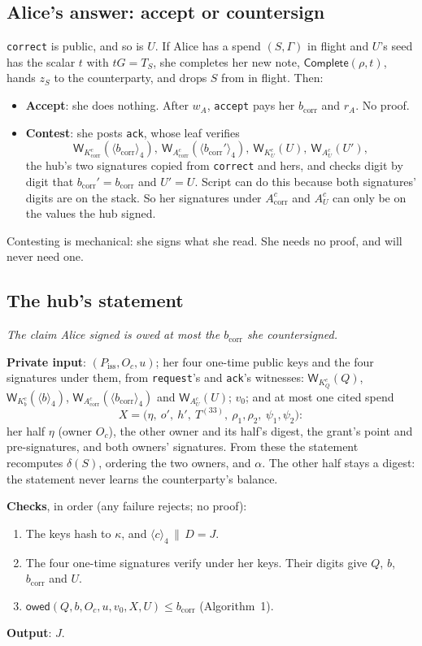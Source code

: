 \documentclass[11pt]{article}
\theoremstyle{plain}
\theoremstyle{definition}
\newcommand{\bcorr}{b_{\mathrm{corr}}}
\newcommand{\tx}[1]{\texttt{#1}}
\newcommand{\be}[2]{\langle #1\rangle_{#2}}
\newcommand{\Compl}{\mathsf{Complete}}
\newcommand{\Wots}{\mathsf{W}}
\newcommand{\Piss}{P_{\mathrm{iss}}}
\newcommand{\owed}{\mathsf{owed}}
\newcommand{\Oc}{O_c}
\newcommand{\KQ}{K_{Q}^{c}}
\newcommand{\Kb}{K_{b}^{c}}
\newcommand{\Kcorr}{K_{\mathrm{corr}}^{c}}
\newcommand{\KU}{K_{U}^{c}}
\newcommand{\Acorr}{A_{\mathrm{corr}}^{c}}
\newcommand{\AU}{A_{U}^{c}}
\begin{document}
\subsection{Alice's answer: accept or countersign}\label{sec:ack}

\tx{correct} is public, and so is $U$. If Alice has a spend $(S,
\Gamma)$ in flight and $U$'s seed has the scalar $t$ with $tG = T_S$,
she completes her new note, $\Compl(\rho, t)$, hands $z_S$ to the
counterparty, and drops $S$ from in flight. Then:
\begin{itemize}[nosep]
\item \textbf{Accept}: she does nothing. After $w_A$, \tx{accept} pays
  her $\bcorr$ and $r_A$. No proof.
\item \textbf{Contest}: she posts \tx{ack}, whose leaf verifies
  \[
    \Wots_{\Kcorr}(\be{\bcorr}{4}),\ \Wots_{\Acorr}(\be{\bcorr'}{4}),\
    \Wots_{\KU}(U),\ \Wots_{\AU}(U'),
  \]
  the hub's two signatures copied from \tx{correct} and hers, and checks
  digit by digit that $\bcorr' = \bcorr$ and $U' = U$. Script can do
  this because both signatures' digits are on the stack. So her
  signatures under $\Acorr$ and $\AU$ can only be on the values the hub
  signed.
\end{itemize}
Contesting is mechanical: she signs what she read. She needs no proof,
and will never need one.

\subsection{The hub's statement}\label{sec:statement}

\emph{The claim Alice signed is owed at most the $\bcorr$ she
countersigned.}

\textbf{Private input}: $(\Piss, \Oc, u)$; her four one-time public
keys and the four signatures under them, from \tx{request}'s and
\tx{ack}'s witnesses: $\Wots_{\KQ}(Q)$, $\Wots_{\Kb}(\be{b}{4})$,
$\Wots_{\Acorr}(\be{\bcorr}{4})$ and $\Wots_{\AU}(U)$; $v_0$; and at
most one cited spend
\[
  X = \big(\eta,\ o',\ h',\ T^{(33)},\ \rho_1, \rho_2,\ \psi_1, \psi_2\big):
\]
her half $\eta$ (owner $\Oc$), the other owner and its half's digest,
the grant's point and pre-signatures, and both owners' signatures. From
these the statement recomputes $\delta(S)$, ordering the two owners, and
$\alpha$. The other half stays a digest: the statement never learns the
counterparty's balance.

\textbf{Checks}, in order (any failure rejects; no proof):
\begin{enumerate}[nosep]
\item The keys hash to $\kappa$, and $\be{c}{4} \,\|\, D = J$.
\item The four one-time signatures verify under her keys. Their digits
  give $Q$, $b$, $\bcorr$ and $U$.
\item $\owed(Q, b, \Oc, u, v_0, X, U) \le \bcorr$ (Algorithm~1).
\end{enumerate}
\textbf{Output}: $J$.
\end{document}
